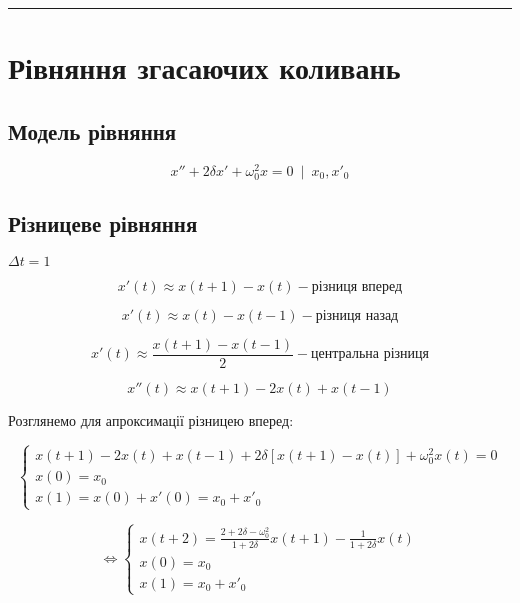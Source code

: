 \documentclass[11pt]{article}
\begin{document}
    \begin{center}\rule{0.5\linewidth}{\linethickness}\end{center}

    \newpage
    \section{Рівняння згасаючих
коливань}\label{ux440ux456ux432ux43dux44fux43dux43dux44f-ux437ux433ux430ux441ux430ux44eux447ux438ux445-ux43aux43eux43bux438ux432ux430ux43dux44c}

    \subsection{Модель
рівняння}\label{ux43cux43eux434ux435ux43bux44c-ux440ux456ux432ux43dux44fux43dux43dux44f}
\[ x''+2\delta x'+\omega_0^2 x=0 \enspace | \enspace x_0, x'_0\]

    \subsection{Різницеве
рівняння}\label{ux440ux456ux437ux43dux438ux446ux435ux432ux435-ux440ux456ux432ux43dux44fux43dux43dux44f}

$ \Delta t = 1 $

\[ x'(t) \approx x(t+1)-x(t)  - \text{різниця вперед}\]

\[ x'(t) \approx x(t)-x(t-1) - \text{різниця назад}\]

\[ x'(t) \approx \frac{x(t+1)-x(t-1)}{2} - \text{центральна різниця}\]

\[ x''(t) \approx x(t+1)-2x(t)+x(t-1) \]

Розглянемо для апроксимації різницею
вперед:

\[ \left \{ \begin{array}{ll}
                          x(t+1)-2x(t)+x(t-1)+2\delta[x(t+1)-x(t)]+\omega_0^2 x(t)=0 \\
                          x(0) = x_0\\
                          x(1) = x(0) + x'(0) = x_0 + x'_0
                       \end{array} \right. \]

\[ \iff \left \{ \begin{array}{ll}
                    x(t+2)=\frac{2+2\delta-\omega_0^2}{1+2\delta}x(t+1)-\frac{1}{1+2\delta}x(t) \\
                    x(0) = x_0\\
                    x(1) = x_0 + x'_0
                 \end{array} \right. \]
\end{document}
